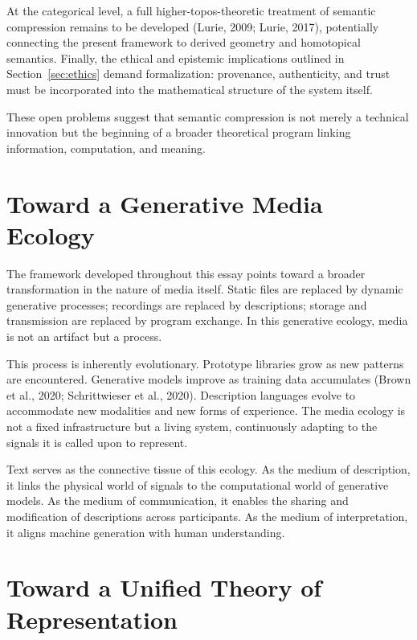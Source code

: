 \documentclass[11pt,a4paper]{article}
\theoremstyle{definition}
\theoremstyle{remark}
\begin{document}
At the categorical level, a full higher-topos-theoretic treatment of semantic compression remains to be developed (Lurie, 2009; Lurie, 2017), potentially connecting the present framework to derived geometry and homotopical semantics. Finally, the ethical and epistemic implications outlined in Section~\ref{sec:ethics} demand formalization: provenance, authenticity, and trust must be incorporated into the mathematical structure of the system itself.

These open problems suggest that semantic compression is not merely a technical innovation but the beginning of a broader theoretical program linking information, computation, and meaning.

\section{Toward a Generative Media Ecology}
\label{sec:ecology}

The framework developed throughout this essay points toward a broader transformation in the nature of media itself. Static files are replaced by dynamic generative processes; recordings are replaced by descriptions; storage and transmission are replaced by program exchange. In this generative ecology, media is not an artifact but a process.

This process is inherently evolutionary. Prototype libraries grow as new patterns are encountered. Generative models improve as training data accumulates (Brown et al., 2020; Schrittwieser et al., 2020). Description languages evolve to accommodate new modalities and new forms of experience. The media ecology is not a fixed infrastructure but a living system, continuously adapting to the signals it is called upon to represent.

Text serves as the connective tissue of this ecology. As the medium of description, it links the physical world of signals to the computational world of generative models. As the medium of communication, it enables the sharing and modification of descriptions across participants. As the medium of interpretation, it aligns machine generation with human understanding.

\section{Toward a Unified Theory of Representation}
\label{sec:final_conclusion}
\end{document}
